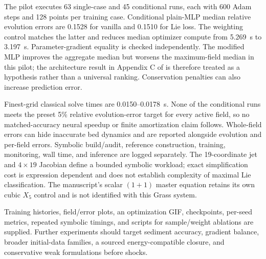 The pilot executes 63 single-case and 45 conditional runs, each with 600 Adam
steps and 128 points per training case. Conditional plain-MLP median relative
evolution errors are 0.1528 for vanilla and 0.1510 for Lie loss.
The weighting control matches the latter and reduces median optimizer compute
from 5.269~s to 3.197~s. Parameter-gradient equality is checked
independently. The modified MLP improves the aggregate median but worsens the
maximum-field median in this pilot; the architecture result in Appendix C of
\cite{akhound2023liepinn} is therefore treated as a hypothesis rather than a
universal ranking. Conservation penalties can also increase prediction error.

Finest-grid classical solve times are 0.0150--0.0178~s. None of the
conditional runs meets the preset 5\% relative evolution-error target for
every active field, so no matched-accuracy neural speedup or finite
amortization claim follows. Whole-field errors can hide inaccurate bed
dynamics and are reported alongside evolution and per-field errors.
Symbolic build/audit, reference construction, training, monitoring, wall
time, and inference are logged separately. The 19-coordinate jet and $4\times19$
Jacobian define a bounded symbolic workload; exact simplification cost is
expression dependent and does not establish complexity of maximal Lie
classification. The manuscript's scalar $(1+1)$ master equation retains its
own cubic $X_5$ control and is not identified with this Grass system.

Training histories, field/error plots, an optimization GIF, checkpoints,
per-seed metrics, repeated symbolic timings, and scripts for sample/weight
ablations are supplied. Further experiments should target sediment accuracy,
gradient balance, broader initial-data families, a sourced energy-compatible
closure, and conservative weak formulations before shocks.
